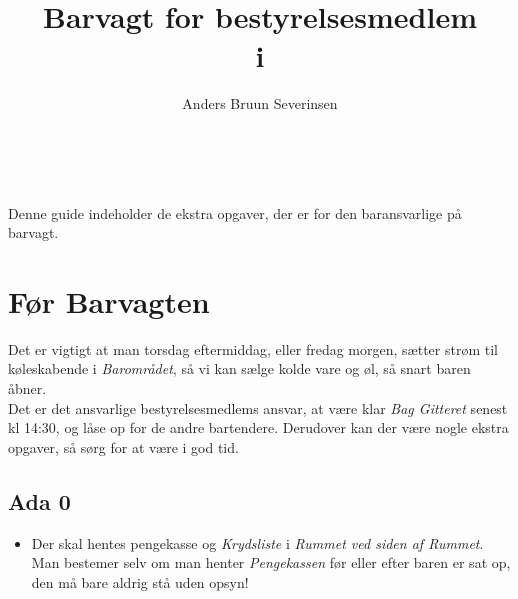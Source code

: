

\title{Barvagt for bestyrelsesmedlem\\ i \fredagscafeen}
\date{}
\author{Anders Bruun Severinsen}



\maketitle

\tableofcontents \

Denne guide indeholder de ekstra opgaver,
der er for den baransvarlige på barvagt.

\section{Før Barvagten}
\label{sec:pre-barvagten}
Det er vigtigt at man torsdag eftermiddag, eller fredag morgen, sætter strøm til køleskabende i
\textit{Barområdet}, så vi kan sælge kolde vare og øl, så snart baren åbner.\\

Det er det ansvarlige bestyrelsesmedlems ansvar, at være klar \textit{Bag Gitteret} senest kl 14:30,
og låse op for de andre bartendere.
Derudover kan der være nogle ekstra opgaver, så sørg for at være i god tid.

\subsection{Ada 0}
\label{sec:pre:ada}

\begin{itemize}
    \item Der skal hentes pengekasse og \textit{Krydsliste} i \textit{Rummet ved siden af
    Rummet}. Man bestemer selv om man henter
    \textit{Pengekassen} før eller efter baren er sat op, den må bare aldrig stå uden opsyn!
\end{itemize}


